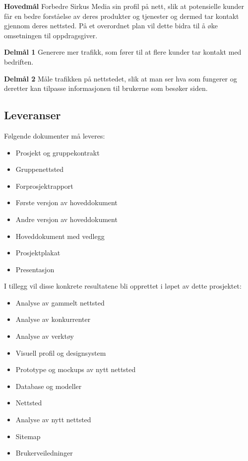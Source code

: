 \documentclass[11pt,a4paper]{report}
\begin{document}
\begin{compactitem}
\item [{\bf Hovedmål}] Forbedre Sirkus Media sin profil på nett, slik at potensielle kunder får en bedre forståelse av deres produkter og tjenester og dermed tar kontakt gjennom deres nettsted. På et overordnet plan vil dette bidra til å øke omsetningen til oppdragsgiver.
\begin{compactitem}
\item [{\bf  Delmål 1} ] Generere mer trafikk, som fører til at flere kunder tar kontakt med bedriften. 
\item [{\bf  Delmål 2} ] Måle trafikken på nettstedet, slik at man ser hva som fungerer og deretter kan tilpasse informasjonen til brukerne som besøker siden.
\end{compactitem}
\end{compactitem}

\subsection*{Leveranser}

Følgende dokumenter må leveres:
\begin{itemize}
\item Prosjekt og gruppekontrakt
\item Gruppenettsted
\item Forprosjektrapport
\item Første versjon av hoveddokument
\item Andre versjon av hoveddokument
\item Hoveddokument med vedlegg
\item Prosjektplakat
\item Presentasjon
\end{itemize}
I tillegg vil disse konkrete resultatene bli opprettet i løpet av dette prosjektet:
\begin{itemize}
\item Analyse av gammelt nettsted
\item Analyse av konkurrenter
\item Analyse av verktøy
\item Visuell profil og designsystem
\item Prototype og mockups av nytt nettsted
\item Database og modeller
\item Nettsted
\item Analyse av nytt nettsted
\item Sitemap
\item Brukerveiledninger
\end{itemize}
\end{document}
